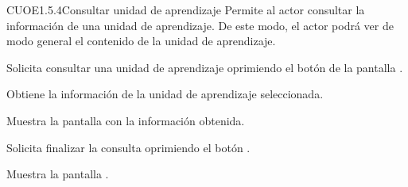 \begin{UseCase}{CUOE1.5.4}{Consultar unidad de aprendizaje}{	
	Permite al actor consultar la información de una unidad de aprendizaje. De este modo, el actor podrá ver de modo general el contenido de la unidad de aprendizaje.
}
{\begin{UClist}
		\end{UClist}
	}
\end{UseCase}

\begin{UCtrayectoria}
	\UCpaso [\UCactor] Solicita consultar una unidad de aprendizaje oprimiendo el botón  de la pantalla . 
	
	\UCpaso [\UCsist] Obtiene la información de la unidad de aprendizaje seleccionada.
	
	\UCpaso [\UCsist] Muestra la pantalla  con la información obtenida.
	
	\UCpaso [\UCactor] Solicita finalizar la consulta oprimiendo el botón . 
	
	\UCpaso [\UCsist] Muestra la pantalla .
	
\end{UCtrayectoria}


